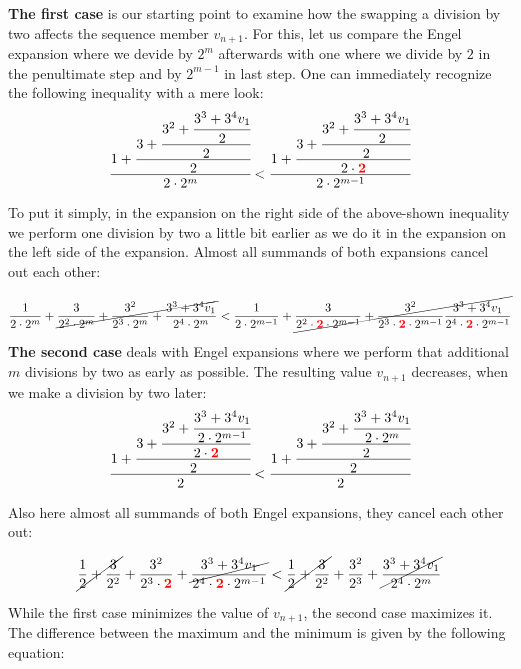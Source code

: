 \documentclass[12pt]{amsart}
\theoremstyle{definition}
\begin{document}
\par\medskip\noindent
\textbf{The first case} is our starting point to examine how the swapping a division by two affects the sequence member $v_{n+1}$. For this, let us compare the Engel expansion where we devide by $2^m$ afterwards with one where we divide by $2$ in the penultimate step and by $2^{m-1}$ in last step. One can immediately recognize the following inequality with a mere look:
\[
\cfrac{1+\cfrac{3+\cfrac{3^2+\cfrac{3^3+3^4v_1}{2}}{2}}{2}}{2\cdot2^m}
<
\cfrac{1+\cfrac{3+\cfrac{3^2+\cfrac{3^3+3^4v_1}{2}}{2}}{2\cdot\textcolor{red}{\mathbf{2}}}}{2\cdot2^{m-1}}
\]

\par\bigskip
To put it simply, in the expansion on the right side of the above-shown inequality we perform one division by two a little bit earlier as we do it in the expansion on the left side of the expansion. Almost all summands of both expansions cancel out each other:

\[
\frac{1}{2\cdot2^m}+\cancel{\frac{3}{2^2\cdot2^m}+\frac{3^2}{2^3\cdot2^m}+\frac{3^3+3^4v_1}{2^4\cdot2^m}}
<
\frac{1}{2\cdot2^{m-1}}+\cancel{\frac{3}{2^2\cdot\textcolor{red}{\mathbf{2}}\cdot2^{m-1}}+\frac{3^2}{2^3\cdot\textcolor{red}{\mathbf{2}}\cdot2^{m-1}}\frac{3^3+3^4v_1}{2^4\cdot\textcolor{red}{\mathbf{2}}\cdot2^{m-1}}}
\]

\par\medskip\noindent
\textbf{The second case} deals with Engel expansions where we perform that additional $m$ divisions by two as early as possible. The resulting value $v_{n+1}$ decreases, when we make a division by two later:
\[
\cfrac{1+\cfrac{3+\cfrac{3^2+\cfrac{3^3+3^4v_1}{2\cdot2^{m-1}}}{2\cdot\textcolor{red}{\mathbf{2}}}}{2}}{2}
<
\cfrac{1+\cfrac{3+\cfrac{3^2+\cfrac{3^3+3^4v_1}{2\cdot2^m}}{2}}{2}}{2}
\]

\par\bigskip
Also here almost all summands of both Engel expansions, they cancel each other out:

\[
\cancel{\frac{1}{2}+\frac{3}{2^2}}+\frac{3^2}{2^3\cdot\textcolor{red}{\mathbf{2}}}+\cancel{\frac{3^3+3^4v_1}{2^4\cdot\textcolor{red}{\mathbf{2}}\cdot2^{m-1}}}
<
\cancel{\frac{1}{2}+\frac{3}{2^2}}+\frac{3^2}{2^3}+\cancel{\frac{3^3+3^4v_1}{2^4\cdot2^m}}
\]

\par\bigskip
While the first case minimizes the value of $v_{n+1}$, the second case maximizes it. The difference between the maximum and the minimum is given by the following equation:
\end{document}
